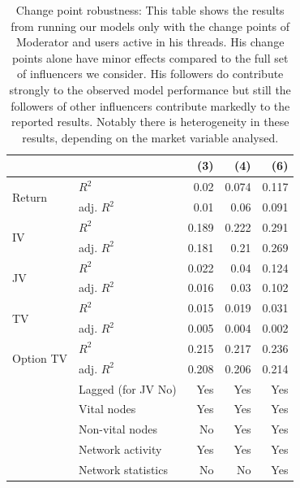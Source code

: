 \begin{table}[ht]
\centering
\caption{Change point robustness: This table shows the results from running our models only with the 
                    change points of Moderator and users active in his threads. His change points alone have minor effects 
                    compared to the full set of influencers we consider. His followers do contribute strongly to the observed 
                    model performance but still the followers of other influencers contribute markedly to the reported results. Notably there is heterogeneity in these results, depending on the market variable analysed.} 
\label{table_r2_robust_onlyMod}
\begingroup\scriptsize
\begin{tabular}{ll|rrr}
  \hline
\hline
  &   & (3) & (4) & (6) \\ 
  \hline
\multirow{2}{*}{Return} & $R^2$ & 0.02 & 0.074 & 0.117 \\ 
    & adj. $R^2$ & 0.01 & 0.06 & 0.091 \\ 
   \hline
\multirow{2}{*}{IV} & $R^2$ & 0.189 & 0.222 & 0.291 \\ 
    & adj. $R^2$ & 0.181 & 0.21 & 0.269 \\ 
   \hline
\multirow{2}{*}{JV} & $R^2$ & 0.022 & 0.04 & 0.124 \\ 
    & adj. $R^2$ & 0.016 & 0.03 & 0.102 \\ 
   \hline
\multirow{2}{*}{TV} & $R^2$ & 0.015 & 0.019 & 0.031 \\ 
    & adj. $R^2$ & 0.005 & 0.004 & 0.002 \\ 
   \hline
\multirow{2}{*}{Option TV} & $R^2$ & 0.215 & 0.217 & 0.236 \\ 
    & adj. $R^2$ & 0.208 & 0.206 & 0.214 \\ 
   \hline & Lagged (for JV No) & Yes & Yes & Yes \\ & Vital nodes & Yes & Yes & Yes \\ & Non-vital nodes & No & Yes & Yes \\ & Network activity & Yes & Yes & Yes \\ & Network statistics & No & No & Yes \\ \hline
\hline
\hline
\end{tabular}
\endgroup
\end{table}
